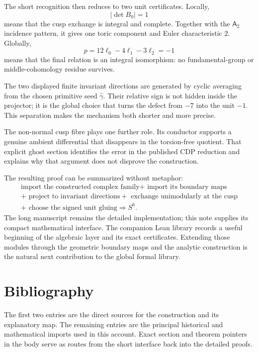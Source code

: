 \documentclass[11pt,reqno]{amsart}
\numberwithin{equation}{section}
\newcommand{\wideg}{\widehat\gamma}
\newcommand{\Aroot}{\mathsf{A}_2}
\theoremstyle{definition}
\begin{document}
The short recognition then reduces to two unit certificates. Locally,
\[
|\det B_0|=1
\]
means that the cusp exchange is integral and complete. Together with the $\Aroot$ incidence pattern, it gives one toric component and Euler characteristic $2$. Globally,
\[
p=12\ell_0-4\ell_1-3\ell_2=-1
\]
means that the final relation is an integral isomorphism: no fundamental-group or middle-cohomology residue survives.

The two displayed finite invariant directions are generated by cyclic averaging from the chosen primitive seed $\wideg$. Their relative sign is not hidden inside the projector; it is the global choice that turns the defect from $-7$ into the unit $-1$. This separation makes the mechanism both shorter and more precise.

The non-normal cusp fibre plays one further role. Its conductor supports a genuine ambient differential that disappears in the torsion-free quotient. That explicit ghost section identifies the error in the published CDP reduction and explains why that argument does not disprove the construction.

The resulting proof can be summarized without metaphor:
\[
\boxed{
\begin{gathered}
\text{import the constructed complex family}
+\text{ import its boundary maps}
\\
+\text{ project to invariant directions}
+\text{ exchange unimodularly at the cusp}
\\
+\text{ choose the signed unit gluing}
\Longrightarrow S^6.
\end{gathered}
}
\]
The long manuscript remains the detailed implementation; this note supplies its compact mathematical interface. The companion Lean library records a useful beginning of the algebraic layer and its exact certificates. Extending those modules through the geometric boundary maps and the analytic construction is the natural next contribution to the global formal library.

\section{Bibliography}\label{sec:bibliography}

The first two entries are the direct sources for the construction and its explanatory map. The remaining entries are the principal historical and mathematical imports used in this account. Exact section and theorem pointers in the body serve as routes from the short interface back into the detailed proofs.
\end{document}
